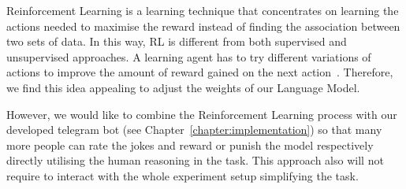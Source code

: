 Reinforcement Learning is a learning technique that concentrates on learning the actions needed to maximise the reward instead of finding the association between two sets of data. In this way, RL is different from both supervised and unsupervised approaches. A learning agent has to try different variations of actions to improve the amount of reward gained on the next action~\parencite{rele}. Therefore, we find this idea appealing to adjust the weights of our Language Model. 
        
However, we would like to combine the Reinforcement Learning process with our developed telegram bot (see Chapter~\ref{chapter:implementation}) so that many more people can rate the jokes and reward or punish the model respectively directly utilising the human reasoning in the task. This approach also will not require to interact with the whole experiment setup simplifying the task. 
